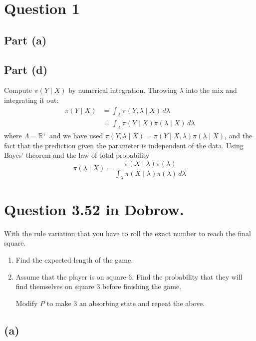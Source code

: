 \documentclass{article}
\begin{document}
\section{Question 1}
\subsection{Part (a)}
\subsection{Part (d)}
Compute $\pi(Y \mid X)$ by numerical integration.
Throwing $\lambda$ into the mix and integrating it out:
\begin{align*}
	\pi(Y \mid X) &= \int_\Lambda \pi(Y, \lambda \mid X) \, d\lambda \\
	&= \int_\Lambda \pi(Y \mid X) \pi(\lambda \mid X) \, d\lambda
\end{align*}
where $\Lambda = \mathbb R^+$ and
we have used $\pi(Y, \lambda \mid X) = \pi(Y \mid X, \lambda) \pi(\lambda \mid X)$,
and the fact that the prediction given the parameter is independent of the data.
Using Bayes' theorem and the law of total probability
$$ \pi(\lambda \mid X) = \frac{\pi(X \mid \lambda) \pi(\lambda)}{\int_\lambda \pi(X \mid \lambda) \pi(\lambda) \, d\lambda} $$

\section{Question \num{3.52} in Dobrow.}
With the rule variation that you have to roll the exact number to reach
the final square.
\begin{enumerate}[label=(\alph*)]
	\item Find the expected length of the game.
	\item Assume that the player is on square 6.
		Find the probability that they will find themselves on square 3 before finishing the game.

		Modify $P$ to make $3$ an absorbing state and repeat the above.
\end{enumerate}

\subsection{(a)}
\end{document}
